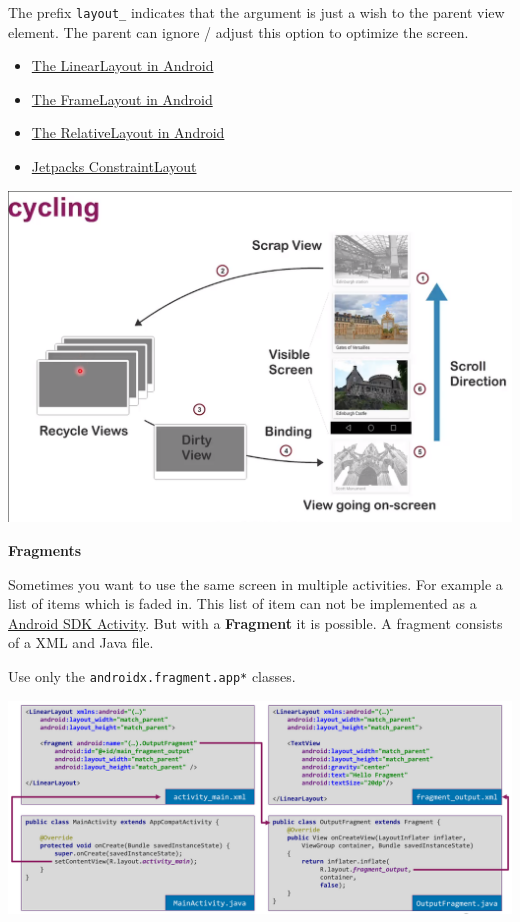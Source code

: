 \documentclass[11pt,twoside,landscape]{article}
\begin{document}
\begin{multicols}{3}
The prefix \texttt{layout\_} indicates that the argument is just a wish to the parent view element. The parent can ignore / adjust this option to optimize the screen.
\begin{itemize}
\item \href{../../../roam/20211017134925-the_linearlayout_in_android.org}{The LinearLayout in Android}
\item \href{../../../roam/20211017134946-the_framelayout_in_android.org}{The FrameLayout in Android}
\item \href{../../../roam/20211017135008-the_relativelayout_in_android.org}{The RelativeLayout in Android}
\item \href{../../../roam/20211017134616-jetpacks_constraintlayout.org}{Jetpacks ConstraintLayout}
\end{itemize}

\begin{center}
\includegraphics[width=.9\linewidth]{img/view_recycling.png}
\end{center}


\textbf{Fragments}

Sometimes you want to use the same screen in multiple activities.
For example a list of items which is faded in.
This list of item can not be implemented as a \href{../../../roam/20210921174424-android_sdk_activity.org}{Android SDK Activity}.
But with a \textbf{Fragment} it is possible.
A fragment consists of a XML and Java file.

Use only the \texttt{androidx.fragment.app*} classes.


\begin{center}
\includegraphics[width=.9\linewidth]{img/fragment_static_include.png}
\end{center}



\end{multicols}
\end{document}
